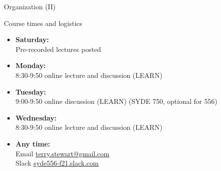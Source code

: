 \documentclass[aspectratio=169]{beamer}
\begin{document}
\begin{frame}{Organization (II)}
	\begin{block}{Course times and logistics}
		\begin{itemize}
			\item \textbf{Saturday:}\\
			Pre-recorded lectures posted
			\item \textbf{Monday:}\\
			8:30-9:50 online lecture and discussion (LEARN)
			\item \textbf{Tuesday:}\\9:00-9:50 online discussion (LEARN) (SYDE 750, optional for 556)
			\item \textbf{Wednesday:}\\
			8:30-9:50 online lecture and discussion (LEARN) 
			\item \textbf{Any time:}\\
Email \url{terry.stewart@gmail.com}\\ Slack \url{syde556-f21.slack.com} 
		\end{itemize}
	\end{block}

\end{frame}
\end{document}
